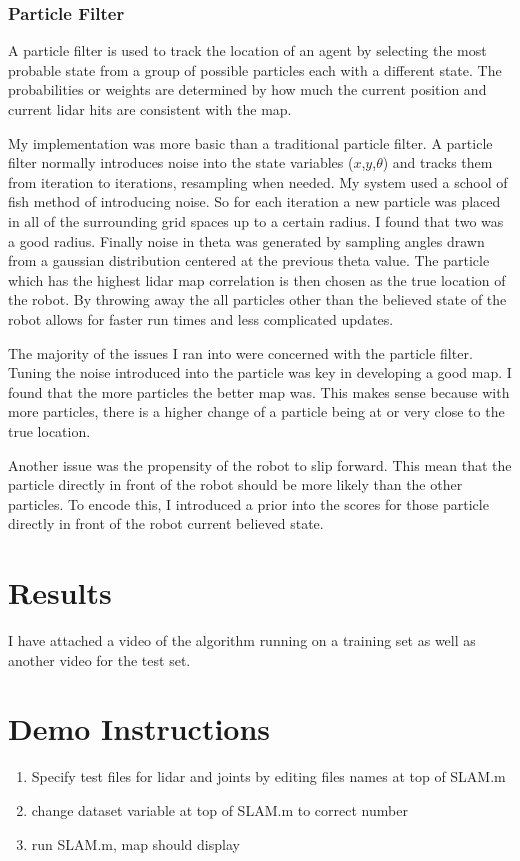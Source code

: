 \documentclass{article}
\begin{document}
\subsubsection{Particle Filter}
\par
A particle filter is used to track the location of an agent by selecting the most probable state from a group of possible particles each with a different state. The probabilities or weights are determined by how much the current position and current lidar hits are consistent with the map.
\par
My implementation was more basic than a traditional particle filter. A particle filter normally introduces noise into the state variables ($x$,$y$,$\theta$) and tracks them from iteration to iterations, resampling when needed. My system used a school of fish method of introducing noise. So for each iteration a new particle was placed in all of the surrounding grid spaces up to a certain radius. I found that two was a good radius. Finally noise in theta was generated by sampling angles drawn from a gaussian distribution centered at the previous theta value. The particle which has the highest lidar map correlation is then chosen as the true location of the robot. By throwing away the all particles other than the believed state of the robot allows for faster run times and less complicated updates.

The majority of the issues I ran into were concerned with the  particle filter. Tuning the noise introduced into the particle was key in developing a good map. I found that the more particles the better map was. This makes sense because with more particles, there is a higher change of a particle being at or very close to the true location.
\par
Another issue was the propensity of the robot to slip forward. This mean that the particle directly in front of the robot should be more likely than the other particles. To encode this, I introduced a prior into the scores for those particle directly in front of the robot current believed state.

\section{Results}
I have attached a video of the algorithm running on a training set as well as another video for the test set. 


\section{Demo Instructions}
\begin{enumerate}
	\item Specify test files for lidar and joints by editing files names at top of SLAM.m
	\item change dataset variable at top of SLAM.m to correct number
	\item run SLAM.m, map should display

\end{enumerate}
\end{document}

